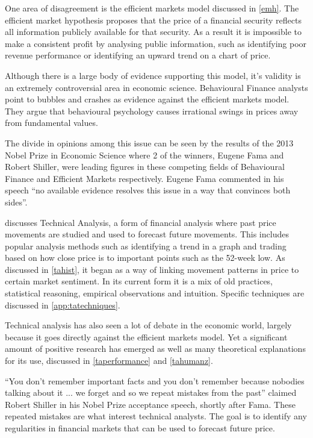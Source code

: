 \documentclass{article}
\theoremstyle{definition}
\begin{document}
One area of disagreement is the efficient markets model discussed in \cref{emh}. The efficient market hypothesis proposes that the price of a financial security reflects all information publicly available for that security. As a result it is impossible to make a consistent profit by analysing public information, such as identifying poor revenue performance or identifying an upward trend on a chart of price.

Although there is a large body of evidence supporting this model, it's validity is an extremely controversial area in economic science. Behavioural Finance analysts point to bubbles and crashes as evidence against the efficient markets model. They argue that behavioural psychology causes irrational swings in prices away from fundamental values. 

The divide in opinions among this issue can be seen by the results of the 2013 Nobel Prize in Economic Science where 2 of the winners, Eugene Fama and Robert Shiller, were leading figures in these competing fields of Behavioural Finance and Efficient Markets respectively. Eugene Fama commented in his speech ``no available evidence resolves this issue in a way that convinces both sides''.

 discusses Technical Analysis, a form of financial analysis where past price movements are studied and used to forecast future movements. This includes popular analysis methods such as identifying a trend in a graph and trading based on how close price is to important points such as the 52-week low. As discussed in \cref{tahist}, it began as a way of linking movement patterns in price to certain market sentiment. In its current form it is a mix of old practices, statistical reasoning, empirical observations and intuition. Specific techniques are discussed in \cref{app:tatechniques}.

Technical analysis has also seen a lot of debate in the economic world, largely because it goes directly against the efficient markets model. Yet a significant amount of positive research has emerged as well as many theoretical explanations for its use, discussed in \cref{taperformance} and \cref{tahumanz}.

``You don't remember important facts and you don't remember because nobodies talking about it ... we forget and so we repeat mistakes from the past'' claimed Robert Shiller in his Nobel Prize acceptance speech, shortly after Fama. These repeated mistakes are what interest technical analysts. The goal is to identify any regularities in financial markets that can be used to forecast future price. 
\end{document}
